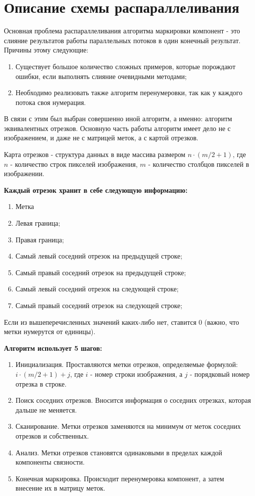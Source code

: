 \documentclass[14pt]{extarticle}
\begin{document}
\section{Описание схемы распараллеливания}
Основная проблема распараллеливания алгоритма маркировки компонент - это слияние результатов работы параллельных потоков в один конечный результат. Причины этому следующие:
\begin{enumerate}
    \item Существует большое количество сложных примеров, которые порождают ошибки, если выполнять слияние очевидными методами;
    \item Необходимо реализовать также алгоритм перенумеровки, так как у каждого потока своя нумерация.
\end{enumerate}
\par В связи с этим был выбран совершенно иной алгоритм, а именно: алгоритм эквивалентных отрезков. Основную часть работы алгоритм имеет дело не с изображением, и даже не с матрицей меток, а с картой отрезков.
\par Карта отрезков - структура данных в виде массива размером \(n\cdot(m/2+1)\), где \(n\) - количество строк пикселей изображения, \(m\) - количество столбцов пикселей в изображении.
\par \textbf{Каждый отрезок хранит в себе следующую информацию:}
\begin{enumerate}
    \item Метка
    \item Левая граница;
    \item Правая граница;
    \item Самый левый соседний отрезок на предыдущей строке;
    \item Самый правый соседний отрезок на предыдущей строке;
    \item Самый левый соседний отрезок на следующей строке;
    \item  Самый правый соседний отрезок на следующей строке;
\end{enumerate}
\par Если из вышеперечисленных значений каких-либо нет, ставится 0 (важно, что метки нумерутся от единицы).
\par \textbf{Алгоритм использует 5 шагов:}
\begin{enumerate}
    \item Инициализация. Проставляются метки отрезков, определяемые формулой: \(i\cdot (m/2+1)+j\), где \(i\) - номер строки изображения, а \(j\) - порядковый номер отрезка в строке.
    \item Поиск соседних отрезков. Вносится информация о соседних отрезках, которая дальше не меняется.
    \item Сканирование. Метки отрезков заменяются на минимум от меток соседних отрезков и собственных.
    \item Анализ. Метки отрезков становятся одинаковыми в пределах каждой компоненты связности.
    \item Конечная маркировка. Происходит перенумеровка компонент, а затем внесение их в матрицу меток.
\end{enumerate}
\end{document}
